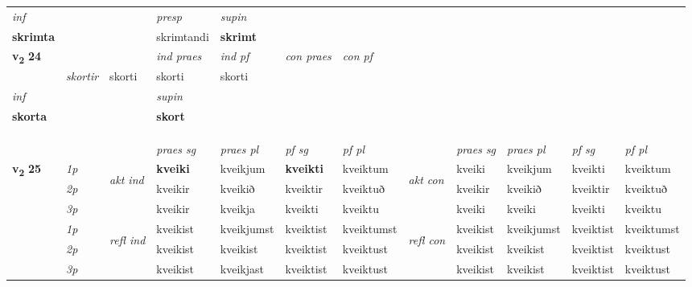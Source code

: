 \begin{longtable}[l]{X>{\footnotesize\itshape}llXXXXlXXXX}
   {\textit{inf}} & &     & \textit{presp} & \textit{supin}   \\*
  {\textbf{skrimta}} & &     & skrimtandi &  \textbf{skrimt}   \\*

\midrule

\multirow{2}{*}{{{\textbf{v{\textsubscript{2}}} \Large{\textbf{24}}}}}  &&&  \textit{ind praes} & \textit{ind pf} & \textit{con praes} & \textit{con pf} \\*
\multicolumn{3}{r}{\textit{e-n / það}} & skortir & skorti & skorti & skorti \\*

\cmidrule{4-7}
   {\textit{inf}} & &      & \textit{supin}   \\*
  {\textbf{skorta}} & &      &  \textbf{skort}   \\*

\midrule

 & \\*
     & \\*
  & \\
   \midrule
 & &   & \textit{praes sg}  & \textit{praes pl}    & \textit{ pf sg} & \textit{pf pl} & & \textit{praes sg}  & \textit{praes pl}    & \textit{pf sg} & \textit{pf pl }  \\ \cmidrule{4-7} \cmidrule{9-12}
 \multirow{2}{*}{{{\textbf{v{\textsubscript{2}}} \Large{\textbf{25}}}}}  & 1p & \multirow{3}{*}{\begin{turn}{90}\textit{akt ind}\end{turn}} & \textbf{kveiki} & kveikjum & \textbf{kveikti} & kveiktum & \multirow{3}{*}{\begin{turn}{90}\textit{akt con}\end{turn}} &kveiki & kveikjum & kveikti & kveiktum\\*
 & 2p &  &  kveikir  & kveikið & kveiktir & kveiktuð & & kveikir & kveikið & kveiktir & kveiktuð \\*
 & 3p &  & kveikir & kveikja & kveikti & kveiktu & & kveiki & kveiki& kveikti & kveiktu \\*
\cmidrule{4-7} \cmidrule{9-12}
 & 1p & \multirow{3}{*}{\begin{turn}{90}\textit{refl ind}\end{turn}}  & kveikist & kveikjumst & kveiktist & kveiktumst & \multirow{3}{*}{\begin{turn}{90}\textit{refl con}\end{turn}}  &kveikist & kveikjumst & kveiktist & kveiktumst \\*
 & 2p &  & kveikist & kveikist & kveiktist & kveiktust & &kveikist & kveikist & kveiktist & kveiktust \\*
 & 3p  & & kveikist & kveikjast & kveiktist & kveiktust & & kveikist & kveikist& kveiktist & kveiktust \\*
\cmidrule{4-7} \cmidrule{9-12}


\end{longtable}
